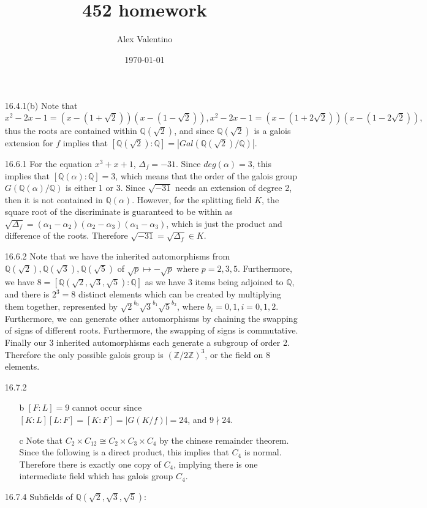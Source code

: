 \documentclass[12pt, letterpaper]{article}
\date{\today}
\author{Alex Valentino}
\title{452 homework}
\newcommand{\Z}{\mathbb{Z}}
\newcommand{\Q}{\mathbb{Q}}
\begin{document}
\begin{enumerate}
	\item[16.4.1(b)] Note that 
	$$x^2 - 2x - 1 = (x-(1+ \sqrt{2}))(x-(1- \sqrt{2})), 
	x^2 - 2x - 1 = (x-(1+ 2\sqrt{2}))(x-(1- 2\sqrt{2})),$$
	thus the roots are contained within $\Q(\sqrt{2})$, and since 
	$\Q(\sqrt{2})$ is a galois extension for $f$ implies that 
	$[\Q(\sqrt{2}): \Q] = |Gal(\Q(\sqrt{2})/ \Q)|$.   	
	\item[16.6.1] For the equation $x^3 + x + 1$, $\Delta_f = -31$.  
	Since $deg(\alpha) = 3$, this implies that $[\Q(\alpha) : \Q] = 3$,
	which means that the order of the galois group $G(\Q(\alpha)/\Q)$ is either 1 
	or 3.  Since $\sqrt{-31}$ needs an extension of degree 2, then 
	it is not contained in  $\Q(\alpha)$.  However, for the splitting 
	field $K$, the square root of the discriminate is guaranteed to 
	be within as $\sqrt{\Delta_f} = (\alpha_1 - \alpha_2)(\alpha_2 - \alpha_3)(\alpha_1 - \alpha_3)$, which is just the product and 
	difference of the roots.  Therefore  
	$\sqrt{-31} = \sqrt{\Delta_f} \in K$.  
	\item[16.6.2] Note that we have the inherited automorphisms 
	from $\Q(\sqrt{2}),\Q(\sqrt{3}),\Q(\sqrt{5})$ of 
	$\sqrt{p} \mapsto -\sqrt{p}$ where $p = 2,3,5$.  Furthermore, 
	we have $8 = [\Q(\sqrt{2},\sqrt{3},\sqrt{5}):\Q]$ as 
	we have $3$ items being adjoined to $\Q$, and there is $2^3 = 8$
	distinct elements which can be created by multiplying them together,
	represented by $\sqrt{2}^{b_0} \sqrt{3}^{b_1} \sqrt{5}^{b_2}$, 
	where $b_i = 0,1, i=0,1,2$.  Furthermore, we can generate other 
	automorphisms by chaining the swapping of signs of different roots.
	Furthermore, the swapping of signs is commutative.  Finally 
	our 3 inherited automorphisms each generate a subgroup of order 2.
	Therefore the only possible galois group is $(\Z/2\Z)^3$, or
	the field on 8 elements.  	 
	\item[16.7.2]
	\begin{enumerate}
		\item[b] $[F:L] = 9$ cannot occur since 
		$[K : L][L : F] = [K:F] = |G(K/f)| = 24$, and $9 \nmid 24$.
		\item[c] Note that $C_2 \times C_{12} \cong C_2 \times C_3 
		\times C_4$ by the chinese remainder theorem.  
		Since the following is a direct product, 
		this implies that $C_4$ is normal.  Therefore there is exactly
		one copy of $C_4$, implying there is one intermediate field 
		which has galois group $C_4$.  
	\end{enumerate}
	\item[16.7.4] Subfields of  $\Q(\sqrt{2},\sqrt{3},\sqrt{5})$:

\end{enumerate}
\end{document}
